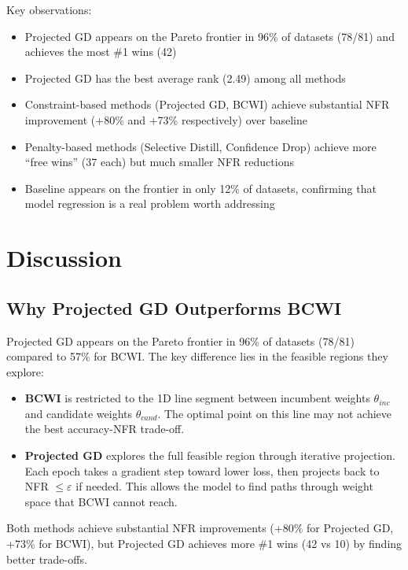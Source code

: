 \documentclass[12pt, letterpaper]{article}
\theoremstyle{remark}
\begin{document}
Key observations:

\begin{itemize}
\item Projected GD appears on the Pareto frontier in 96\% of datasets (78/81) and achieves the most \#1 wins (42)
\item Projected GD has the best average rank (2.49) among all methods
\item Constraint-based methods (Projected GD, BCWI) achieve substantial NFR improvement (+80\% and +73\% respectively) over baseline
\item Penalty-based methods (Selective Distill, Confidence Drop) achieve more ``free wins'' (37 each) but much smaller NFR reductions
\item Baseline appears on the frontier in only 12\% of datasets, confirming that model regression is a real problem worth addressing
\end{itemize}

\section{Discussion}

\subsection{Why Projected GD Outperforms BCWI}

Projected GD appears on the Pareto frontier in 96\% of datasets (78/81) compared to 57\% for BCWI. The key difference lies in the feasible regions they explore:

\begin{itemize}
\item \textbf{BCWI} is restricted to the 1D line segment between incumbent weights $\theta_{inc}$ and candidate weights $\theta_{cand}$. The optimal point on this line may not achieve the best accuracy-NFR trade-off.
\item \textbf{Projected GD} explores the full feasible region through iterative projection. Each epoch takes a gradient step toward lower loss, then projects back to NFR $\leq \varepsilon$ if needed. This allows the model to find paths through weight space that BCWI cannot reach.
\end{itemize}

Both methods achieve substantial NFR improvements (+80\% for Projected GD, +73\% for BCWI), but Projected GD achieves more \#1 wins (42 vs 10) by finding better trade-offs.
\end{document}
